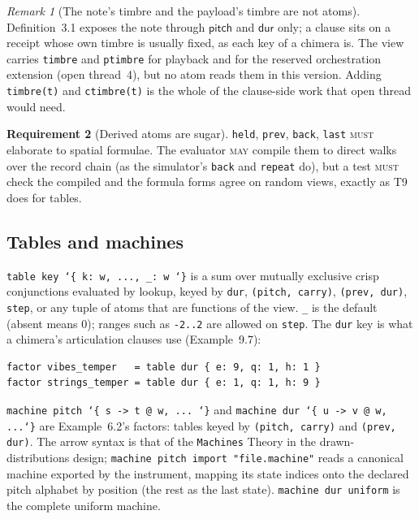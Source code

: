 \documentclass[11pt,a4paper]{article}
\theoremstyle{definition}
\newtheorem{requirement}{Requirement}[section]
\theoremstyle{remark}
\newtheorem{remark}[requirement]{Remark}
\newcommand{\MUST}{\textsc{must}}
\newcommand{\MAY}{\textsc{may}}
\newcommand{\atm}[1]{\mathsf{#1}}
\begin{document}
\begin{remark}[The note's timbre and the payload's timbre are not atoms]
Definition~3.1 exposes the note through $\atm{pitch}$ and $\atm{dur}$ only; a
clause sits on a receipt whose own timbre is usually fixed, as each key of a
chimera is. The view carries \texttt{timbre} and \texttt{ptimbre} for playback
and for the reserved orchestration extension (open thread~4), but no atom reads
them in this version. Adding \texttt{timbre(t)} and \texttt{ctimbre(t)} is the
whole of the clause-side work that open thread would need.
\end{remark}

\begin{requirement}[Derived atoms are sugar]\label{req:derived}
\texttt{held}, \texttt{prev}, \texttt{back}, \texttt{last} \MUST{} elaborate to
spatial formulae. The evaluator \MAY{} compile them to direct walks over the
record chain (as the simulator's \texttt{back} and \texttt{repeat} do), but a
test \MUST{} check the compiled and the formula forms agree on random views,
exactly as T9 does for tables.
\end{requirement}

\subsection{Tables and machines}

\texttt{table key \char`\{ k: w, ..., \_: w \char`\}} is a sum over mutually exclusive crisp
conjunctions evaluated by lookup, keyed by \texttt{dur}, \texttt{(pitch,
carry)}, \texttt{(prev, dur)}, \texttt{step}, or any tuple of atoms that are
functions of the view. \texttt{\_} is the default (absent means 0); ranges such
as \texttt{-2..2} are allowed on \texttt{step}. The \texttt{dur} key is what a
chimera's articulation clauses use (Example~9.7):
\begin{lstlisting}[language=score]
factor vibes_temper   = table dur { e: 9, q: 1, h: 1 }
factor strings_temper = table dur { e: 1, q: 1, h: 9 }
\end{lstlisting}

\texttt{machine pitch \char`\{ s -> t @ w, ... \char`\}} and \texttt{machine dur \char`\{ u -> v @ w,
...\char`\}} are Example~6.2's factors: tables keyed by \texttt{(pitch, carry)} and
\texttt{(prev, dur)}. The arrow syntax is that of the \texttt{Machines} Theory
in the drawn-distributions design; \texttt{machine pitch import "file.machine"}
reads a canonical machine exported by the instrument, mapping its state indices
onto the declared pitch alphabet by position (the rest as the last state).
\texttt{machine dur uniform} is the complete uniform machine.
\end{document}
